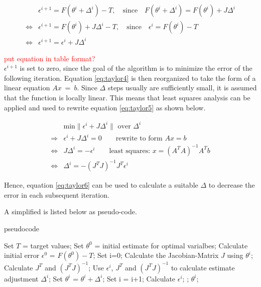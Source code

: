 \begin{align}
	& \epsilon^{i+1} = F(\theta^{i} + \Delta^{i}) - T, \quad \text{since} \quad F(\theta^{i} + \Delta^{i}) = F(\theta^{i}) + J \Delta^{i} \\
	\Leftrightarrow & \epsilon^{i+1} = F(\theta^{i}) + J \Delta^{i} - T, \quad \text{since} \quad \epsilon^{i} = F(\theta^{i}) - T \\
	\Leftrightarrow & \epsilon^{i+1} = \epsilon^{i} + J \Delta^{i} \label{eq:taylor4}
\end{align}

\textcolor{red}{put equation in table format?}\\
$\epsilon^{i+1}$ is set to zero, since the goal of the algorithm is to minimize the error of the following iteration. Equation \ref*{eq:taylor4}
is then reorganized to take the form of a linear equation $Ax~=~b$. Since $\Delta$ steps usually are sufficiently small, it is assumed that the function is locally
	linear. This means that least squares analysis can be applied and used to rewrite equation \ref*{eq:taylor5} as shown below.

\begin{align}
	&\text{min} \| \epsilon^{i} + J \Delta^{i} \|\text{ over $\Delta^{i}$} \\
	\Rightarrow & \epsilon^{i} + J \Delta^{i} = 0 \qquad \text{rewrite to form $Ax = b$} \\
	\Leftrightarrow & J \Delta^{i} = -\epsilon^{i} \qquad \text{least squares: } x = (A^T A)^{-1} A^T b \label{eq:taylor5} \\
	\Leftrightarrow & \Delta^{i} = - (J^T J)^{-1} J^T \epsilon^{i} \label{eq:taylor6}
\end{align}

Hence, equation \ref*{eq:taylor6} can be used to calculate a suitable $\Delta$ to decrease the error in each subsequent iteration.\newline

A simplified  is listed below as pseudo-code.

\begin{algorithm}
	\caption{ pseudocode}
	\begin{algorithmic}
		\State Set $T$ = target values;
		\State Set $\theta^{0}$ = initial estimate for optimal varialbes;
		\State Calculate initial error $\epsilon^0$ = $F(\theta^0) - T$;
		\State Set i=0;
			\State Calculate the Jacobian-Matrix $J$ using $\theta^i$;
			\State Calculate $J^{T}$ and  $(J^{T}J)^{-1}$;
			\State Use $\epsilon^i$, $J^{T}$ and  $(J^{T}J)^{-1}$ to calculate estimate adjustment $\Delta^i$;
			\State Set $\theta^{i}$ = $\theta^{i} + \Delta^i$;
			\State Set i = i+1;
			\State Calculate $\epsilon^i$;
		\EndWhile;
		\State {} $\theta^i$;
	\end{algorithmic}
\end{algorithm}


